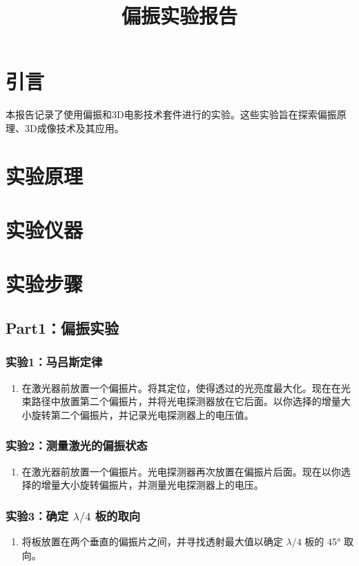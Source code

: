 \documentclass{ctexart}
\title{偏振实验报告}
\begin{document}
\maketitle

\section{引言}
本报告记录了使用偏振和3D电影技术套件进行的实验。这些实验旨在探索偏振原理、3D成像技术及其应用。
\section{实验原理}
\section{实验仪器}
\section{实验步骤}
\subsection{Part1：偏振实验}

\subsubsection{实验1：马吕斯定律}
\begin{enumerate}
    \item 在激光器前放置一个偏振片。将其定位，使得透过的光亮度最大化。现在在光束路径中放置第二个偏振片，并将光电探测器放在它后面。以你选择的增量大小旋转第二个偏振片，并记录光电探测器上的电压值。
\end{enumerate}

\subsubsection{实验2：测量激光的偏振状态}
\begin{enumerate}
    \item 在激光器前放置一个偏振片。光电探测器再次放置在偏振片后面。现在以你选择的增量大小旋转偏振片，并测量光电探测器上的电压。
\end{enumerate}

\subsubsection{实验3：确定 $\lambda/4$ 板的取向}
\begin{enumerate}
    \item 将板放置在两个垂直的偏振片之间，并寻找透射最大值以确定 $\lambda/4$ 板的 45° 取向。
\end{enumerate}
\end{document}
